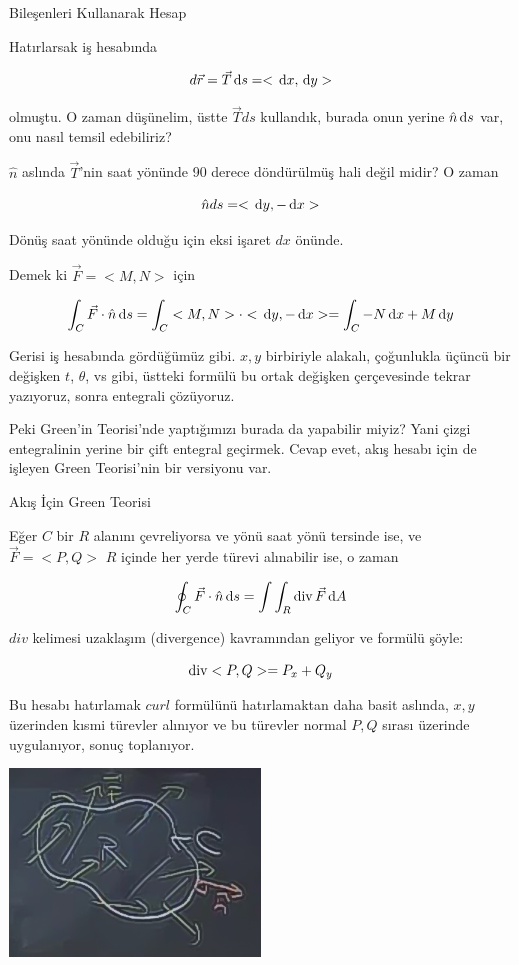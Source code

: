 \documentclass[12pt,fleqn]{article}\usepackage{../../common}
\begin{document}
Bileşenleri Kullanarak Hesap

Hatırlarsak iş hesabında 

$$ d\vec{r} = \vec{T} \,\mathrm{d} s = < \,\mathrm{d} x, \,\mathrm{d} y > $$

olmuştu. O zaman düşünelim, üstte $\vec{T} ds$ kullandık, burada onun
yerine $\hat{n} \,\mathrm{d} s$ var, onu nasıl temsil edebiliriz? 

$\hat{n}$ aslında $\vec{T}$'nin saat yönünde 90 derece döndürülmüş hali
değil midir? O zaman 

$$ \hat{n}ds = < \,\mathrm{d} y,-\,\mathrm{d} x > $$

Dönüş saat yönünde olduğu için eksi işaret $dx$ önünde. 

Demek ki $\vec{F} = < M,N >$ için

$$
\int_C \vec{F} \cdot \hat{n} \,\mathrm{d} s =
\int_C  < M,N > \cdot < \,\mathrm{d} y,-\,\mathrm{d} x > =  \int_C -N \,\mathrm{d} x + M \,\mathrm{d} y
$$

Gerisi iş hesabında gördüğümüz gibi. $x,y$ birbiriyle alakalı, çoğunlukla
üçüncü bir değişken $t$, $\theta$, vs gibi, üstteki formülü bu ortak
değişken çerçevesinde tekrar yazıyoruz, sonra entegrali çözüyoruz. 

Peki Green'in Teorisi'nde yaptığımızı burada da yapabilir miyiz? Yani çizgi
entegralinin yerine bir çift entegral geçirmek. Cevap evet, akış hesabı için de
işleyen Green Teorisi'nin bir versiyonu var.

Akış İçin Green Teorisi

Eğer $C$ bir $R$ alanını çevreliyorsa ve yönü saat yönü tersinde ise, ve
$\vec{F}=< P,Q >$ $R$ içinde her yerde türevi alınabilir ise, o zaman 

$$ \oint_C \vec{F} \cdot \hat{n} \,\mathrm{d} s = 
\int \int_R \operatorname{div} \vec{F} \,\mathrm{d} A
$$

$div$ kelimesi uzaklaşım (divergence) kavramından geliyor ve formülü şöyle:

$$ \operatorname{div} < P,Q > = P_x + Q_y $$

Bu hesabı hatırlamak $curl$ formülünü hatırlamaktan daha basit aslında,
$x,y$ üzerinden kısmi türevler alınıyor ve bu türevler normal $P,Q$ sırası
üzerinde uygulanıyor, sonuç toplanıyor. 

\begin{center}
\includegraphics[height=5cm]{23_8.png}
\end{center}
\end{document}
